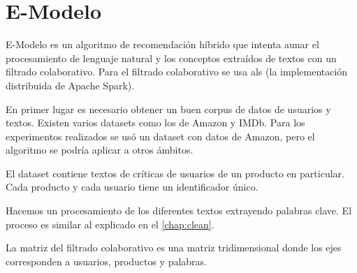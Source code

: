 \documentclass[withindex, glossary]{cam-thesis}
\begin{document}
\chapter{E-Modelo}
E-Modelo\cite{emodelo} es un algoritmo de recomendación híbrido que intenta aunar el procesamiento de lenguaje natural y los conceptos extraídos de textos con un filtrado colaborativo. Para el filtrado colaborativo se usa \acrfull{als} (la implementación distribuida de Apache Spark).

En primer lugar es necesario obtener un buen corpus de datos de usuarios y textos. Existen varios datasets como los de Amazon y IMDb. Para los experimentos realizados se usó un dataset con datos de Amazon, pero el algoritmo se podría aplicar a otros ámbitos.

El dataset contiene textos de críticas de usuarios de un producto en particular. Cada producto y cada usuario tiene un identificador único.

Hacemos un procesamiento de los diferentes textos extrayendo palabras clave. El proceso es similar al explicado en el \autoref{chap:clean}.

La matriz del filtrado colaborativo es una matriz tridimensional donde los ejes corresponden a usuarios, productos y palabras.
\end{document}
